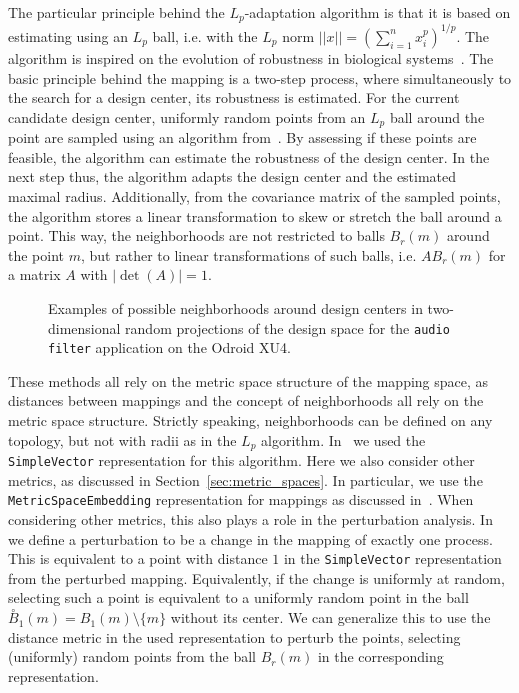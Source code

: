 The particular principle behind the $L_p$-adaptation algorithm is that it is based on estimating using an $L_p$ ball, i.e. with the $L_p$ norm $||x|| = (\sum_{i=1}^n x_i^p)^{1/p}$.
The algorithm is inspired on the evolution of robustness in biological systems~\cite{asmus2017lp}.
The basic principle behind the mapping is a two-step process, where simultaneously to the search for a design center, its robustness is estimated.
For the current candidate design center, uniformly random points from an $L_p$ ball around the point are sampled using an algorithm from~\cite{calafiore1998uniform}.
By assessing if these points are feasible, the algorithm can estimate the robustness of the design center.
In the next step thus, the algorithm adapts the design center and the estimated maximal radius.
Additionally, from the covariance matrix of the sampled points, the algorithm stores a linear transformation to skew or stretch the ball around a point.
This way, the neighborhoods are not restricted to balls $B_r(m)$ around the point $m$, but rather to linear transformations of such balls, i.e. $A B_r(m)$ for a matrix $A$ with $|\operatorname{det}(A)| = 1$.

\begin{figure}[h]
	\centering
	\caption{Examples of possible neighborhoods around design centers in two-dimensional random projections of the design space for the \texttt{audio filter} application on the Odroid XU4.}
	\label{fig:design_centering_exynos}
\end{figure}

These methods all rely on the metric space structure of the mapping space, as distances between mappings and the concept of neighborhoods all rely on the metric space structure.
Strictly speaking, neighborhoods can be defined on any topology, but not with radii as in the $L_p$ algorithm.
In~\cite{hempel_scopes17} we used the \texttt{SimpleVector} representation for this algorithm.
Here we also consider other metrics, as discussed in Section~\ref{sec:metric_spaces}.
In particular, we use the \texttt{MetricSpaceEmbedding} representation for mappings as discussed in~\cite{sec:representations}.
When considering other metrics, this also plays a role in the perturbation analysis.
In~\cite{hempel_scopes17} we define a perturbation to be a change in the mapping of exactly one process.
This is equivalent to a point with distance $1$ in the \texttt{SimpleVector} representation from the perturbed mapping.
Equivalently, if the change is uniformly at random, selecting such a point is equivalent to a uniformly random point in the ball $\overset{\circ}{B}_1(m) = B_1(m) \setminus \{ m \}$ without its center.
We can generalize this to use the distance metric in the used representation to perturb the points, selecting (uniformly) random points from the ball $B_r(m)$ in the corresponding representation.


